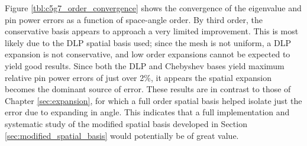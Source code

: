 Figure \ref{tbl:c5g7_order_convergence} shows the convergence of 
the eigenvalue and pin power errors as a function of space-angle 
order.  By third order, the conservative basis appears to approach 
a very limited improvement.  This is most likely due to the DLP 
spatial basis used; since the mesh is not uniform, a DLP expansion is 
not conservative, and low order expansions cannot be expected to 
yield good results.  Since both the DLP and Chebyshev bases yield 
maximum relative pin power errors of just over 2\%, it appears 
the spatial expansion becomes the dominant source of error.  These 
results are in contrast to those of Chapter \ref{sec:expansion}, 
for which a full order spatial basis helped isolate just the 
error due to expanding in angle.  This indicates that a full 
implementation and systematic
study of the modified spatial basis developed in
Section \ref{sec:modified_spatial_basis} would potentially be 
of great value.

